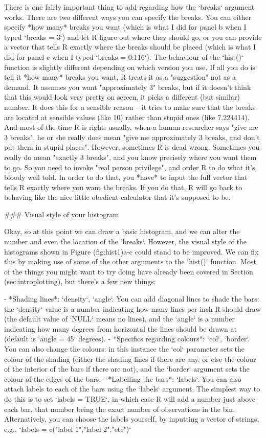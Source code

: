There is one fairly important thing to add regarding how the `breaks` argument works. There are two different ways you can specify the breaks. You can either specify *how many* breaks you want (which is what I did for panel b when I typed `breaks = 3`) and let R figure out where they should go, or you can provide a vector that tells R exactly where the breaks should be placed (which is what I did for panel c when I typed `breaks = 0:116`). The behaviour of the `hist()` function is slightly different depending on which version you use. If all you do is tell it *how many* breaks you want, R treats it as a "suggestion" not as a demand. It assumes you want "approximately 3" breaks, but if it doesn't think that this would look very pretty on screen, it picks a different (but similar) number. It does this for a sensible reason -- it tries to make sure that the breaks are located at sensible values (like 10) rather than stupid ones (like 7.224414). And most of the time R is right: usually, when a human researcher says "give me 3 breaks", he or she really does mean "give me approximately 3 breaks, and don't put them in stupid places". However, sometimes R is dead wrong. Sometimes you really do mean "exactly 3 breaks", and you know precisely where you want them to go.  So you need to invoke "real person privilege", and order R to do what it's bloody well told. In order to do that, you *have* to input the full vector that tells R exactly where you want the breaks. If you do that, R will go back to behaving like the nice little obedient calculator that it's supposed to be. 

### Visual style of your histogram

Okay, so at this point we can draw a basic histogram, and we can alter the number and even the location of the `breaks`. However, the visual style of the histograms shown in Figure \@ref(fig:hist1)a-c could stand to be improved. We can fix this by making use of some of the other arguments to the `hist()` function. Most of the things you might want to try doing have already been covered in Section \@ref(sec:introplotting), but there's a few new things: 

- *Shading lines*: `density`, `angle`. You can add diagonal lines to shade the bars: the `density` value is a number indicating how many lines per inch R should draw (the default value of `NULL` means no lines), and the `angle` is a number indicating how many degrees from horizontal the lines should be drawn at (default is `angle = 45` degrees). 
- *Specifics regarding colours*: `col`, `border`. You can also change the colours: in this instance the `col` parameter sets the colour of the shading (either the shading lines if there are any, or else the colour of the interior of the bars if there are not), and the `border` argument sets the colour of the edges of the bars. 
- *Labelling the bars*: `labels`.  You can also attach labels to each of the bars using the `labels` argument. The simplest way to do this is to set `labels = TRUE`, in which case R will add a number just above each bar, that number being the exact number of observations in the bin. Alternatively, you can choose the labels yourself, by inputting a vector of strings, e.g., `labels = c("label 1","label 2","etc")`

